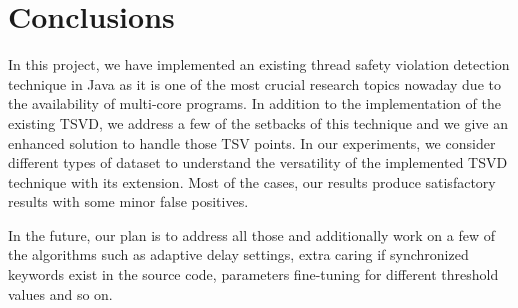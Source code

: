 \section{Conclusions}
\label{sec:conclusion}

In this project, we have implemented an existing thread safety violation
detection technique in Java as it is one of the most crucial research topics
nowaday due to the availability of multi-core programs. In addition to the
implementation of the existing TSVD, we address a few of the setbacks of this
technique and we give an enhanced solution to handle those TSV points. In our
experiments, we consider different types of dataset to understand the
versatility of the implemented TSVD technique with its extension. Most of the
cases, our results produce satisfactory results with some minor false
positives.

In the future, our plan is to address all those and additionally
work on a few of the algorithms such as adaptive delay settings, extra caring
if synchronized keywords exist in the source code, parameters fine-tuning for
different threshold values and so on.


